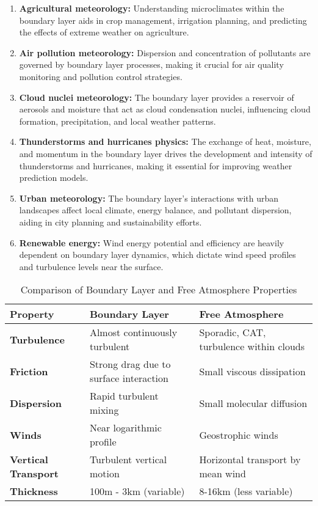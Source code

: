 \documentclass[fleqn,10pt]{SelfArx} %
\begin{document}
\begin{enumerate}[noitemsep]
	\item \textbf{Agricultural meteorology:} Understanding microclimates within the boundary layer aids in crop management, irrigation planning, and predicting the effects of extreme weather on agriculture.
	\item \textbf{Air pollution meteorology:} Dispersion and concentration of pollutants are governed by boundary layer processes, making it crucial for air quality monitoring and pollution control strategies.
	\item \textbf{Cloud nuclei meteorology:} The boundary layer provides a reservoir of aerosols and moisture that act as cloud condensation nuclei, influencing cloud formation, precipitation, and local weather patterns.
	\item \textbf{Thunderstorms and hurricanes physics:} The exchange of heat, moisture, and momentum in the boundary layer drives the development and intensity of thunderstorms and hurricanes, making it essential for improving weather prediction models.
	\item \textbf{Urban meteorology:} The boundary layer's interactions with urban landscapes affect local climate, energy balance, and pollutant dispersion, aiding in city planning and sustainability efforts.
	\item \textbf{Renewable energy:} Wind energy potential and efficiency are heavily dependent on boundary layer dynamics, which dictate wind speed profiles and turbulence levels near the surface.
\end{enumerate}

\begin{table}[ht!]
	\centering
	\begin{tabular}{|p{1.6cm}|p{3cm}|p{3cm}|}
		\hline
		\rowcolor{blue!20} \textbf{Property}            & \textbf{Boundary Layer}                & \textbf{Free Atmosphere}                \\
		\hline
		\cellcolor{blue!10} \textbf{Turbulence}         & Almost continuously turbulent          & Sporadic, CAT, turbulence within clouds \\
		\hline
		\cellcolor{blue!10} \textbf{Friction}           & Strong drag due to surface interaction & Small viscous dissipation               \\
		\hline
		\cellcolor{blue!10} \textbf{Dispersion}         & Rapid turbulent mixing                 & Small molecular diffusion               \\
		\hline
		\cellcolor{blue!10} \textbf{Winds}              & Near logarithmic profile               & Geostrophic winds                       \\
		\hline
		\cellcolor{blue!10} \textbf{Vertical Transport} & Turbulent vertical motion              & Horizontal transport by mean wind       \\
		\hline
		\cellcolor{blue!10} \textbf{Thickness}          & 100m - 3km (variable)                  & 8-16km (less variable)                  \\
		\hline
	\end{tabular}
	\caption{Comparison of Boundary Layer and Free Atmosphere Properties}
	\label{tab:boundary_free}
\end{table}
\end{document}
